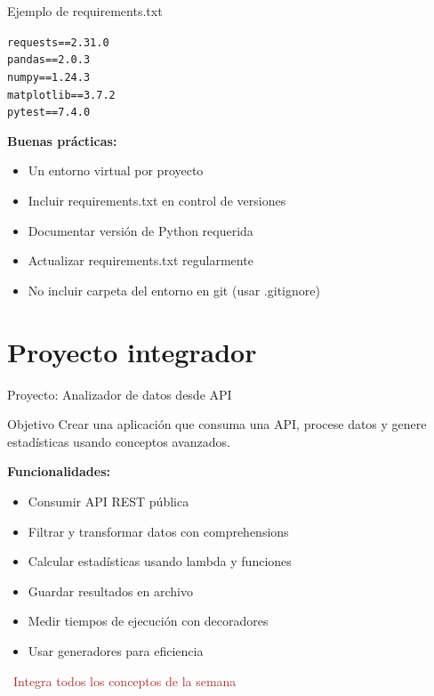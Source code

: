 \documentclass{beamer}
\begin{document}
\begin{frame}[fragile]{Ejemplo de requirements.txt \faFileAlt}
\begin{tcolorbox}[colback=bg1,colframe=brown,left=3pt,right=3pt,top=2pt,bottom=2pt]
\small\texttt{requests==2.31.0\\
pandas==2.0.3\\
numpy==1.24.3\\
matplotlib==3.7.2\\
pytest==7.4.0}
\end{tcolorbox}

\vspace{0.3cm}
\textbf{Buenas prácticas:}
\small
\begin{itemize}
    \item[\faCheck] Un entorno virtual por proyecto
    \item[\faCheck] Incluir requirements.txt en control de versiones
    \item[\faCheck] Documentar versión de Python requerida
    \item[\faCheck] Actualizar requirements.txt regularmente
    \item[\faCheck] No incluir carpeta del entorno en git (usar .gitignore)
\end{itemize}
\end{frame}

\section{Proyecto integrador}

\begin{frame}{Proyecto: Analizador de datos desde API \faChartLine}
\begin{conceptbox}{Objetivo}
Crear una aplicación que consuma una API, procese datos y genere estadísticas usando conceptos avanzados.
\end{conceptbox}

\textbf{Funcionalidades:}
\small
\begin{itemize}
    \item[\faCloud] Consumir API REST pública
    \item[\faFilter] Filtrar y transformar datos con comprehensions
    \item[\faChartBar] Calcular estadísticas usando lambda y funciones
    \item[\faSave] Guardar resultados en archivo
    \item[\faStopwatch] Medir tiempos de ejecución con decoradores
    \item[\faRecycle] Usar generadores para eficiencia
\end{itemize}

\vspace{0.2cm}
\begin{center}
\textcolor{brown}{\faLightbulb\ Integra todos los conceptos de la semana}
\end{center}
\end{frame}
\end{document}
